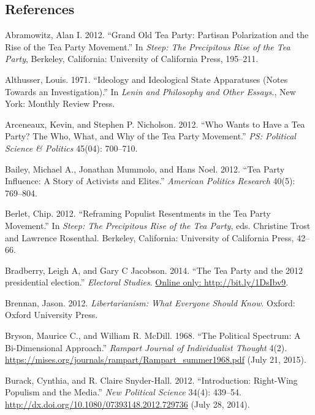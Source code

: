 \documentclass[12pt,]{article}
\begin{document}
\pagebreak

\subsection{References}\label{references}

\setlength{\parindent}{-0.2in} \setlength{\leftskip}{0.2in}
\setlength{\parskip}{8pt} \vspace*{-0.2in} \noindent

Abramowitz, Alan I. 2012. ``Grand Old Tea Party: Partisan Polarization
and the Rise of the Tea Party Movement.'' In \emph{Steep: The
Precipitous Rise of the Tea Party}, Berkeley, California: University of
California Press, 195--211.

Althusser, Louis. 1971. ``Ideology and Ideological State Apparatuses
(Notes Towards an Investigation).'' In \emph{Lenin and Philosophy and
Other Essays.}, New York: Monthly Review Press.

Arceneaux, Kevin, and Stephen P. Nicholson. 2012. ``Who Wants to Have a
Tea Party? The Who, What, and Why of the Tea Party Movement.'' \emph{PS:
Political Science \& Politics} 45(04): 700--710.

Bailey, Michael A., Jonathan Mummolo, and Hans Noel. 2012. ``Tea Party
Influence: A Story of Activists and Elites.'' \emph{American Politics
Research} 40(5): 769--804.

Berlet, Chip. 2012. ``Reframing Populist Resentments in the Tea Party
Movement.'' In \emph{Steep: The Precipitous Rise of the Tea Party}, eds.
Christine Trost and Lawrence Rosenthal. Berkeley, California: University
of California Press, 42--66.

Bradberry, Leigh A, and Gary C Jacobson. 2014. ``The Tea Party and the
2012 presidential election.'' \emph{Electoral Studies}.
\href{Online only: http://bit.ly/1DsIbv9}{Online only: http://bit.ly/1DsIbv9}.

Brennan, Jason. 2012. \emph{Libertarianism: What Everyone Should Know}.
Oxford: Oxford University Press.

Bryson, Maurice C., and William R. McDill. 1968. ``The Political
Spectrum: A Bi-Dimensional Approach.'' \emph{Rampart Journal of
Individualist Thought} 4(2).
\url{https://mises.org/journals/rampart/Rampart_summer1968.pdf} (July
21, 2015).

Burack, Cynthia, and R. Claire Snyder-Hall. 2012. ``Introduction:
Right-Wing Populism and the Media.'' \emph{New Political Science} 34(4):
439--54. \url{http://dx.doi.org/10.1080/07393148.2012.729736} (July 28,
2014).
\end{document}
